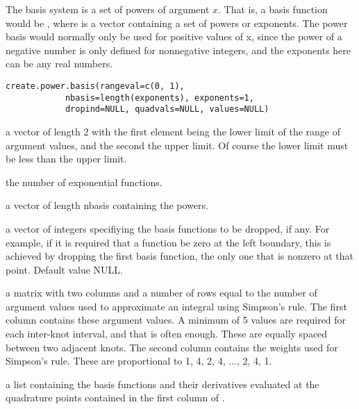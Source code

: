 \begin{Description}\relax
The basis system is a set of powers of argument $x$.  That is, a basis
function would be , where 
is a vector containing a set of powers or
exponents.  The power basis would normally only be used for positive
values of x, since the power of a negative number is only defined
for nonnegative integers, and the exponents here can be any real
numbers.
\end{Description}
\begin{Usage}
\begin{verbatim}
create.power.basis(rangeval=c(0, 1),
            nbasis=length(exponents), exponents=1,
            dropind=NULL, quadvals=NULL, values=NULL)
\end{verbatim}
\end{Usage}
\begin{Arguments}
\begin{ldescription}
\item[\code{rangeval}] a vector of length 2 with the first element being the lower limit of the
range of argument values, and the second the upper limit.  Of course the
lower limit must be less than the upper limit.

\item[\code{nbasis}] the number of exponential functions.

\item[\code{exponents}] a vector of length nbasis containing the powers.

\item[\code{dropind}] a vector of integers specifiying the basis functions to
be dropped, if any.  For example, if it is required that
a function be zero at the left boundary, this is achieved
by dropping the first basis function, the only one that
is nonzero at that point. Default value NULL.

\item[\code{quadvals}] a matrix with two columns and a number of rows equal to the number of
argument values used to approximate an integral using Simpson's rule.
The first column contains these argument values.
A minimum of 5 values are required for
each inter-knot interval, and that is often enough. These
are equally spaced between two adjacent knots.
The second column contains the weights used for Simpson's
rule.  These are proportional to 1, 4, 2, 4, ..., 2, 4, 1.

\item[\code{values}] a list containing the basis functions and their derivatives
evaluated at the quadrature points contained in the first
column of .

\end{ldescription}
\end{Arguments}

